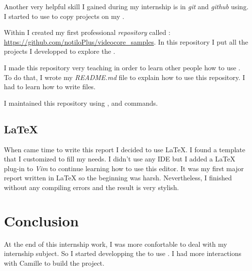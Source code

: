 Another very helpful skill I gained during my internship is in \emph{git} and \emph{github} using. I started to use  to copy projects on my \rasp.

Within \groupname{} I created my first professional \emph{repository} called : \url{https://github.com/notiloPlus/videocore_samples}. In this repository I put all the projects I developped to explore the \vc.

I made this repository very teaching in order to learn other people how to use \vc. To do that, I wrote my \emph{README.md} file to explain how to use this repository. I had to learn how to write  files.

I maintained this repository using ,  and  commands.


\subsection{\LaTeX}

When came time to write this report I decided to use \LaTeX{}. I found a template that I customized to fill my needs. I didn't use any IDE but I added a \LaTeX{} plug-in to \emph{Vim} to continue learning how to use this editor. It was my first major report written in \LaTeX{} so the beginning was harsh. Nevertheless, I finished without any compiling errors and the result is very stylish.


\section{Conclusion}\label{Conclusion2}

At the end of this internship work, I was more confortable to deal with my internship subject. So I started developping the \api{} to use \vc. I had more interactions with Camille to build the \flow{} project. 
